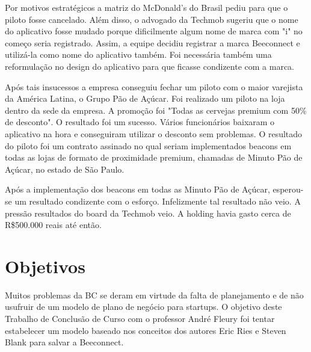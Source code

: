 Por motivos estratégicos a matriz do McDonald's do Brasil pediu para que o piloto fosse cancelado. Além disso, o advogado da Techmob sugeriu que o nome do aplicativo fosse mudado porque dificilmente algum nome de marca com "i" no começo seria registrado. Assim, a equipe decidiu registrar a marca Beeconnect e utilizá-la como nome do aplicativo também. Foi necessária também uma reformulação no design do aplicativo para que ficasse condizente com a marca.

Após tais insucessos a empresa conseguiu fechar um piloto com o maior varejista da América Latina, o Grupo Pão de Açúcar. Foi realizado um piloto na loja dentro da sede da empresa. A promoção foi "Todas as cervejas premium com 50\% de desconto". O resultado foi um sucesso. Vários funcionários baixaram o aplicativo na hora e conseguiram utilizar o desconto sem problemas. O resultado do piloto foi um contrato assinado no qual seriam implementados beacons em todas as lojas de formato de proximidade premium, chamadas de Minuto Pão de Açúcar, no estado de São Paulo.

Após a implementação dos beacons em todas as Minuto Pão de Açúcar, esperou-se um resultado condizente com o esforço. Infelizmente tal resultado não veio. A pressão resultados do board da Techmob veio. A holding havia gasto cerca de R\$500.000 reais até então.

\section[Objetivos]{Objetivos}
\label{chap:objetivos}

Muitos problemas da BC se deram em virtude da falta de planejamento e de não usufruir de um modelo de plano de negócio para startups. O objetivo deste Trabalho de Conclusão de Curso com o professor André Fleury foi tentar estabelecer um modelo baseado nos conceitos dos autores Eric Ries e Steven Blank para salvar a Beeconnect.